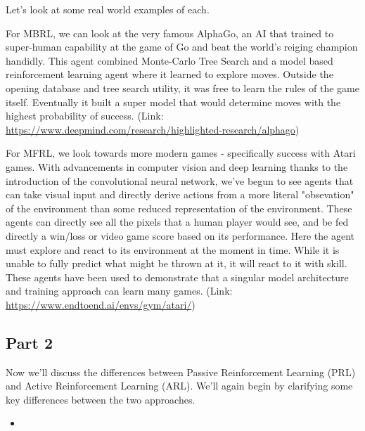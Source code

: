 \documentclass{article}
\begin{document}
\noindent Let's look at some real world examples of each.

For MBRL, we can look at the very famous AlphaGo, an AI that trained to super-human capability at the game of Go and beat the world's reiging champion handidly. This agent combined Monte-Carlo Tree Search and a model based reinforcement learning agent where it learned to explore moves. Outside the opening database and tree search utility, it was free to learn the rules of the game itself. Eventually it built a super model that would determine moves with the highest probability of success. (Link: \url{https://www.deepmind.com/research/highlighted-research/alphago})

For MFRL, we look towards more modern games - specifically success with Atari games. With advancements in computer vision and deep learning thanks to the introduction of the convolutional neural network, we've begun to see agents that can take visual input and directly derive actions from a more literal "obsevation" of the environment than some reduced representation of the environment. These agents can directly see all the pixels that a human player would see, and be fed directly a win/loss or video game score based on its performance. Here the agent must explore and react to its environment at the moment in time. While it is unable to fully predict what might be thrown at it, it will react to it with skill. These agents have been used to demonstrate that a singular model architecture and training approach can learn many games. (Link: \url{https://www.endtoend.ai/envs/gym/atari/})

\subsection*{Part 2}

Now we'll discuss the differences between Passive Reinforcement Learning (PRL) and Active Reinforcement Learning (ARL). We'll again begin by clarifying some key differences between the two approaches.

\begin{itemize}
    \item 
\end{itemize}
\end{document}
